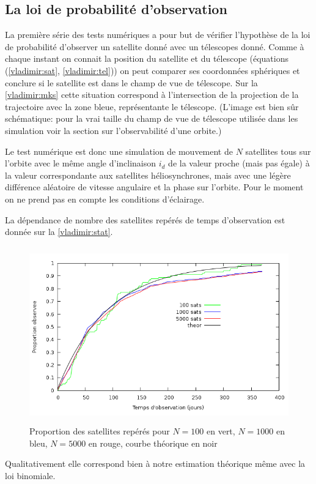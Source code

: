 \subsection{La loi de probabilit\'e d'observation}
La premi\`ere s\'erie des tests num\'eriques a pour but de v\'erifier
l'hypoth\`ese de la loi de probabilit\'e d'observer un satellite 
donn\'e avec un t\'elescopes donn\'e. 
Comme \`a chaque instant on connait la position du satellite et du t\'elescope
(équations (\ref{vladimir:sat}, \ref{vladimir:tel})) on peut comparer ses coordonn\'ees sph\'eriques 
et conclure si le satellite est dans le champ de vue de t\'elescope. Sur la \autoref{vladimir:mks} cette situation correspond \`a l'intersection de la projection de la
trajectoire avec la zone bleue, repr\'esentante le t\'elescope.
(L'image est bien sûr sch\'ematique: pour la vrai taille du champ de vue de t\'elescope
utilis\'ee dans les simulation voir la section sur l'observabilit\'e d'une orbite.)

Le test num\'erique est donc une simulation de mouvement de $N$ satellites
tous sur l'orbite avec le m\^eme angle d'inclinaison $i_d$ de la valeur proche (mais pas \'egale) 
\`a la valeur correspondante aux satellites h\'eliosynchrones, mais avec une l\'eg\`ere diff\'erence 
al\'eatoire de vitesse angulaire et la phase sur l'orbite. Pour le moment on 
ne prend pas en compte les conditions d'\'eclairage. 

La d\'ependance de nombre des satellites rep\'er\'es de temps d'observation
est donn\'ee sur la \autoref{vladimir:stat}. 
 \begin{figure}[htp] \centering
      \includegraphics*[height=3in]{stat.png}
      \caption{
            \label{vladimir:stat}
  Proportion des satellites rep\'er\'es pour  $N = 100$ en vert, $N = 1000$ en bleu, $N = 5000$ en rouge, courbe th\'eorique
  en noir}
 \end{figure}
Qualitativement elle correspond bien \`a notre estimation th\'eorique m\^eme avec la loi
binomiale.  

